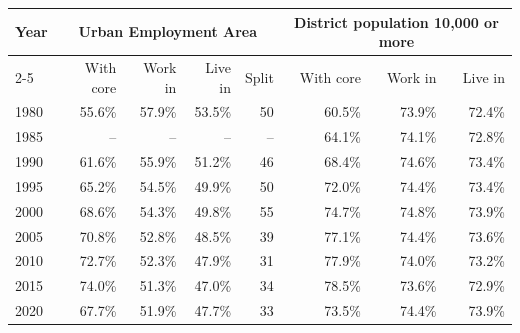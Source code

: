 \begin{tabular}{lrrrrrrr}
\hline\hline
Year & \multicolumn{4}{c}{Urban Employment Area} & \multicolumn{3}{c}{District population 10,000 or more} \\\cline{2-5} \cline{6-8}& With core & Work in & Live in & Split & With core & Work in & Live in \\
\hline
1980 & 55.6\% & 57.9\% & 53.5\% & 50 & 60.5\% & 73.9\% & 72.4\% \\
1985 & -- & -- & -- & -- & 64.1\% & 74.1\% & 72.8\% \\
1990 & 61.6\% & 55.9\% & 51.2\% & 46 & 68.4\% & 74.6\% & 73.4\% \\
1995 & 65.2\% & 54.5\% & 49.9\% & 50 & 72.0\% & 74.4\% & 73.4\% \\
2000 & 68.6\% & 54.3\% & 49.8\% & 55 & 74.7\% & 74.8\% & 73.9\% \\
2005 & 70.8\% & 52.8\% & 48.5\% & 39 & 77.1\% & 74.4\% & 73.6\% \\
2010 & 72.7\% & 52.3\% & 47.9\% & 31 & 77.9\% & 74.0\% & 73.2\% \\
2015 & 74.0\% & 51.3\% & 47.0\% & 34 & 78.5\% & 73.6\% & 72.9\% \\
2020 & 67.7\% & 51.9\% & 47.7\% & 33 & 73.5\% & 74.4\% & 73.9\% \\
\hline\hline
\end{tabular}
